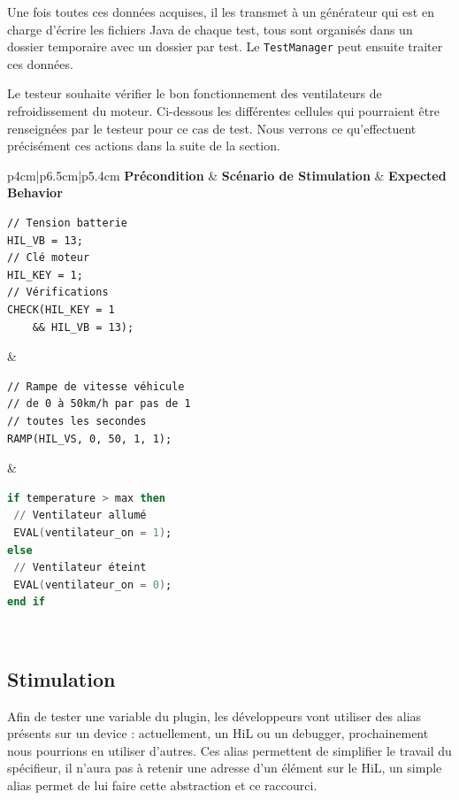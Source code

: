 Une fois toutes ces données acquises, il les transmet à un générateur qui est en charge d'écrire les fichiers Java de chaque test, tous sont organisés dans un dossier temporaire avec un dossier par test. Le \texttt{TestManager} peut ensuite traiter ces données.

\begin{exemple}
Le testeur souhaite vérifier le bon fonctionnement des ventilateurs de refroidissement du moteur. Ci-dessous les différentes cellules qui pourraient être renseignées par le testeur pour ce cas de test. Nous verrons ce qu'effectuent précisément ces actions dans la suite de la section.	

\begin{tabular}{p{4cm}|p{6.5cm}|p{5.4cm}}
	\textbf{Précondition} & \textbf{Scénario de Stimulation} & \textbf{Expected Behavior}\\
	\hline
	\begin{minipage}{0.1\linewidth}
		\begin{lstlisting}[framerule=0pt,language=gtl]
// Tension batterie
HIL_VB = 13;
// Clé moteur
HIL_KEY = 1;
// Vérifications
CHECK(HIL_KEY = 1 
	&& HIL_VB = 13);
	\end{lstlisting}
	\end{minipage} & 
	\begin{minipage}{0.1\linewidth}
		\begin{lstlisting}[framerule=0pt,language=gtl]
// Rampe de vitesse véhicule
// de 0 à 50km/h par pas de 1 
// toutes les secondes	
RAMP(HIL_VS, 0, 50, 1, 1);
		\end{lstlisting}
	\end{minipage} 
	&
		\begin{minipage}{0.1\linewidth}
			\begin{lstlisting}[language=ada,framerule=0pt,language=gtl]	
if temperature > max then
 // Ventilateur allumé
 EVAL(ventilateur_on = 1); 
else
 // Ventilateur éteint
 EVAL(ventilateur_on = 0); 
end if
			\end{lstlisting}
		\end{minipage} 
	\\
\end{tabular}
\end{exemple}

\subsection{Stimulation} \label{stim}
\vspace{-20px}
Afin de tester une variable du plugin, les développeurs vont utiliser des alias présents sur un device : actuellement, un HiL ou un debugger, prochainement nous pourrions en utiliser d'autres. Ces alias permettent de simplifier le travail du spécifieur, il n'aura pas à retenir une adresse d'un élément sur le HiL, un simple alias permet de lui faire cette abstraction et ce raccourci.

